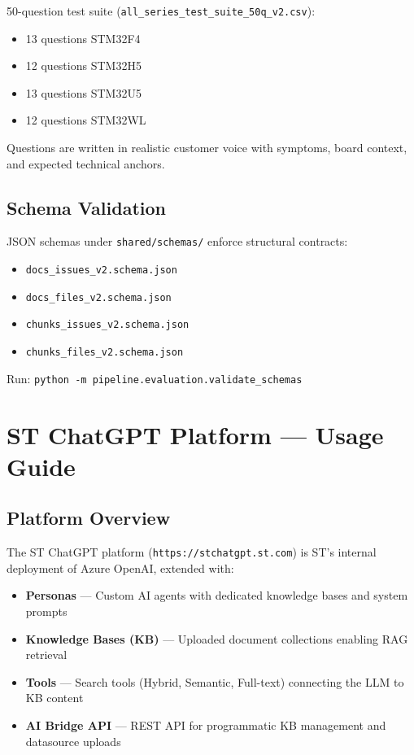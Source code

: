 \documentclass[12pt,a4paper]{report}
\begin{document}
50-question test suite (\texttt{all\_series\_test\_suite\_50q\_v2.csv}):
\begin{itemize}
  \item 13 questions STM32F4
  \item 12 questions STM32H5
  \item 13 questions STM32U5
  \item 12 questions STM32WL
\end{itemize}

Questions are written in realistic customer voice with symptoms, board context, and expected technical anchors.

\section{Schema Validation}

JSON schemas under \texttt{shared/schemas/} enforce structural contracts:
\begin{itemize}
  \item \texttt{docs\_issues\_v2.schema.json}
  \item \texttt{docs\_files\_v2.schema.json}
  \item \texttt{chunks\_issues\_v2.schema.json}
  \item \texttt{chunks\_files\_v2.schema.json}
\end{itemize}

Run: \texttt{python -m pipeline.evaluation.validate\_schemas}

\chapter{ST ChatGPT Platform --- Usage Guide}

\section{Platform Overview}

The ST ChatGPT platform (\texttt{https://stchatgpt.st.com}) is ST's internal deployment of Azure OpenAI, extended with:
\begin{itemize}
  \item \textbf{Personas} --- Custom AI agents with dedicated knowledge bases and system prompts
  \item \textbf{Knowledge Bases (KB)} --- Uploaded document collections enabling RAG retrieval
  \item \textbf{Tools} --- Search tools (Hybrid, Semantic, Full-text) connecting the LLM to KB content
  \item \textbf{AI Bridge API} --- REST API for programmatic KB management and datasource uploads
\end{itemize}
\end{document}
